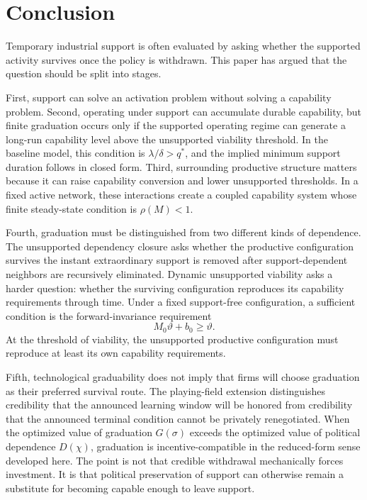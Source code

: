 \section{Conclusion}
\label{sec:conclusion}

Temporary industrial support is often evaluated by asking whether the supported activity survives once the policy is withdrawn. This paper has argued that the question should be split into stages.

First, support can solve an activation problem without solving a capability problem. Second, operating under support can accumulate durable capability, but finite graduation occurs only if the supported operating regime can generate a long-run capability level above the unsupported viability threshold. In the baseline model, this condition is $\lambda/\delta>q^*$, and the implied minimum support duration follows in closed form. Third, surrounding productive structure matters because it can raise capability conversion and lower unsupported thresholds. In a fixed active network, these interactions create a coupled capability system whose finite steady-state condition is $\rho(M)<1$.

Fourth, graduation must be distinguished from two different kinds of dependence. The unsupported dependency closure asks whether the productive configuration survives the instant extraordinary support is removed after support-dependent neighbors are recursively eliminated. Dynamic unsupported viability asks a harder question: whether the surviving configuration reproduces its capability requirements through time. Under a fixed support-free configuration, a sufficient condition is the forward-invariance requirement
\[
M_0\vartheta+b_0\ge\vartheta.
\]
At the threshold of viability, the unsupported productive configuration must reproduce at least its own capability requirements.

Fifth, technological graduability does not imply that firms will choose graduation as their preferred survival route. The playing-field extension distinguishes credibility that the announced learning window will be honored from credibility that the announced terminal condition cannot be privately renegotiated. When the optimized value of graduation $G(\sigma)$ exceeds the optimized value of political dependence $D(\chi)$, graduation is incentive-compatible in the reduced-form sense developed here. The point is not that credible withdrawal mechanically forces investment. It is that political preservation of support can otherwise remain a substitute for becoming capable enough to leave support.


